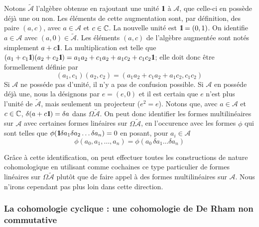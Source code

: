\begin{itemize}
Notons $\tilde {\mathcal A}$ l'alg\`ebre obtenue en rajoutant une 
unit\'e $\mbox{\rm 1}\hskip-3pt \mbox{\rm l}$ \`a ${\mathcal A}$, que celle-ci en poss\`ede d\'ej\`a une ou non. Les \'el\'ements de cette 
augmentation sont, par d\'efinition, des paire $(a,c)$, avec $a \in {\mathcal A}$ et $c 
\in \mathbb{C}$. La nouvelle unit\'e est $\mbox{\rm 1}\hskip-3pt \mbox{\rm l}  =  (0,1)$. 
On identifie $a \in {\mathcal A}$ avec $(a,0) \in \tilde{\mathcal 
A}$. Les \'el\'ements $(a,c)$ de l'alg\`ebre augment\'ee sont not\'es 
simplement
$a + c \mbox{\rm 1}\hskip-3pt \mbox{\rm l}$. La multiplication est telle que $ (a_{1} + c_{1} 
\mbox{\rm 1}\hskip-3pt \mbox{\rm l})(a_{2} + c_{2} \mbox{\rm 1}\hskip-3pt \mbox{\rm l}) = a_{1}a_{2} + c_{1}a_{2} + a_{1}c_{2} + 
c_{1} c_{2}\mbox{\rm 1}\hskip-3pt \mbox{\rm l} $; elle doit donc \^etre formellement d\'efinie par
$$(a_{1},c_{1})(a_{2},c_{2})  =  (a_{1}a_{2} + c_{1}a_{2} + 
a_{1}c_{2}, c_{1} c_{2})$$
Si ${\mathcal A}$ ne poss\'ede pas  d'unit\'e, il n'y a pas de confusion possible. Si ${\mathcal A}$ en 
poss\'ede d\'ej\`a une, nous la d\'esignons par $e  =  (e,0)$ et il est certain que 
$e$ n'est plus l'unit\'e de $\tilde {\mathcal A}$, mais seulement un 
projecteur ($e^{2}=e$). 
Notons que, avec $a \in {\mathcal A}$ et $c \in \mathbb{C}$,  $\delta (a + c \mbox{\rm 1}\hskip-3pt \mbox{\rm l}) = 
\delta a$ dans $ \Omega \tilde {\mathcal A}$.
On peut donc identifier les formes multilin\'eaires sur ${\mathcal A}$ 
avec certaines formes lin\'eaires sur  $ \Omega \tilde {\mathcal A}$, en 
l'occurence avec les formes $\phi$ qui sont telles que
$\phi(\mbox{\rm 1}\hskip-3pt \mbox{\rm l} \delta a_{1} \delta a_{2} \ldots \delta a_{n} ) = 0$ en 
posant, pour $a_{i} \in  {\mathcal A}$ 
$$ \phi(a_{0},a_{1},\ldots,a_{n})  =  \phi(a_{0} \, \delta a_{1} \ldots \delta a_{n}) $$

Gr\^ace \`a cette identification, on peut effectuer toutes les 
constructions de nature cohomologique en utilisant comme cochaines ce type 
particulier de formes lin\'eaires sur  $\Omega \tilde {\mathcal A}$ plut\^ot 
que de faire appel \`a des formes multilin\'eaires sur ${\mathcal A}$.
Nous n'irons cependant pas plus loin dans cette direction.

\par 


\end{itemize}


\subsubsection{La cohomologie cyclique : une cohomologie de De Rham non 
commutative} 

